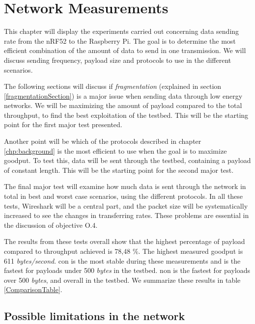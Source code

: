 \chapter{Network Measurements}
\label{chp:measurements2}


\noindent This chapter will display the experiments carried out concerning data sending rate from the \gls{nRF52} to the \gls{Raspberry Pi}. The goal is to determine the most efficient combination of the amount of data to send in one transmission. We will discuss sending frequency, \gls{payload} size and protocols to use in the different scenarios. 

\noindent The following sections will discuss if \textit{fragmentation} (explained in section \ref{fragmentationSection}) is a major issue when sending data through low energy networks. We will be maximizing the amount of \gls{payload} compared to the total throughput, to find the best exploitation of the testbed. This will be the starting point for the first major test presented. 

\noindent Another point will be which of the protocols described in chapter \ref{chp:background} is the most efficient to use when the goal is to maximize \gls{goodput}. To test this, data will be sent through the testbed, containing a payload of constant length. This will be the starting point for the second major test.

\noindent The final major test will examine how much data is sent through the network in total in best and worst case scenarios, using the different protocols. In all these tests, Wireshark will be a central part, and the packet size will be systematically increased to see the changes in transferring rates. These problems are essential in the discussion of objective O.4. 

\noindent The results from these tests overall show that the highest percentage of \gls{payload} compared to \gls{throughput} achieved is 78,48 \%. The highest measured \gls{goodput} is 611 \textit{bytes/second}. \gls{con} is the most stable during these measurements and is the fastest for \glspl{payload} under 500 \textit{bytes} in the testbed. \gls{non} is the fastest for \glspl{payload} over 500 \textit{bytes}, and overall in the testbed. We summarize these results in table \ref{ComparisonTable}. 


\section{Possible limitations in the network}

